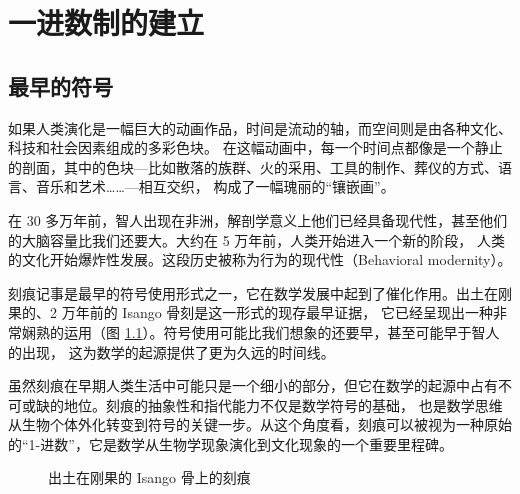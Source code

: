 \chapter{一进数制的建立}

\section{最早的符号}

如果人类演化是一幅巨大的动画作品，时间是流动的轴，而空间则是由各种文化、科技和社会因素组成的多彩色块。
在这幅动画中，每一个时间点都像是一个静止的剖面，其中的色块—比如散落的族群、火的采用、工具的制作、葬仪的方式、语言、音乐和艺术……—相互交织，
构成了一幅瑰丽的“镶嵌画”。

在 30 多万年前，智人出现在非洲，解剖学意义上他们已经具备现代性，甚至他们的大脑容量比我们还要大。大约在 5 万年前，人类开始进入一个新的阶段，
人类的文化开始爆炸性发展。这段历史被称为行为的现代性（Behavioral modernity）。

刻痕记事是最早的符号使用形式之一，它在数学发展中起到了催化作用。出土在刚果的、2 万年前的 Isango 骨刻是这一形式的现存最早证据，
它已经呈现出一种非常娴熟的运用（图 \ref{fig:isango}）。符号使用可能比我们想象的还要早，甚至可能早于智人的出现，
这为数学的起源提供了更为久远的时间线。

虽然刻痕在早期人类生活中可能只是一个细小的部分，但它在数学的起源中占有不可或缺的地位。刻痕的抽象性和指代能力不仅是数学符号的基础，
也是数学思维从生物个体外化转变到符号的关键一步。从这个角度看，刻痕可以被视为一种原始的“1-进数”，它是数学从生物学现象演化到文化现象的一个重要里程碑。

\begin{figure}[ht]\centering
{}
\caption{出土在刚果的 Isango 骨上的刻痕}\label{fig:isango}
\end{figure}

